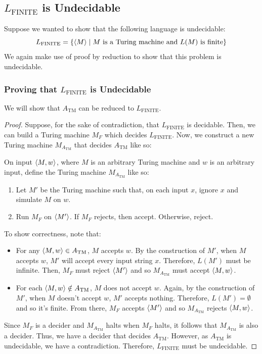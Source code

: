 \documentclass[letterpaper]{article}
\begin{document}
\subsection{\texorpdfstring{$L_{\text{FINITE}}$}{} is Undecidable}
Suppose we wanted to show that the following language is undecidable: 
\[L_{\text{FINITE}} = \{\langle M \rangle \mid M \text{ is a Turing machine and } L(M) \text{ is finite}\}\]
We again make use of proof by reduction to show that this problem is undecidable.

\subsubsection{Proving that \texorpdfstring{$L_{\text{FINITE}}$}{} is Undecidable}
We will show that $A_{\text{TM}}$ can be reduced to $L_{\text{FINITE}}$. 

\begin{mdframed}[]
    \begin{proof}
        Suppose, for the sake of contradiction, that $L_{\text{FINITE}}$ is decidable. Then, we can build a Turing machine $M_{F}$ which decides $L_{\text{FINITE}}$. Now, we construct a new Turing machine $M_{A_{\text{TM}}}$ that decides $A_{\text{TM}}$ like so: 
        \begin{mdframed}[]
            On input $\langle M, w \rangle$, where $M$ is an arbitrary Turing machine and $w$ is an arbitrary input, define the Turing machine $M_{A_{\text{TM}}}$ like so: 
            \begin{enumerate}
                \item Let $M'$ be the Turing machine such that, on each input $x$, ignore $x$ and simulate $M$ on $w$. 
                \item Run $M_F$ on $\langle M' \rangle$. If $M_F$ rejects, then accept. Otherwise, reject. 
            \end{enumerate}
        \end{mdframed}

        To show correctness, note that: 
        \begin{itemize}
            \item For any $\langle M, w \rangle \in A_{\text{TM}}$, $M$ accepts $w$. By the construction of $M'$, when $M$ accepts $w$, $M'$ will accept every input string $x$. Therefore, $L(M')$ must be infinite. Then, $M_F$ must reject $\langle M' \rangle$ and so $M_{A_{\text{TM}}}$ must accept $\langle M, w \rangle$. 
            \item For each $\langle M, w \rangle \notin A_{\text{TM}}$, $M$ does not accept $w$. Again, by the construction of $M'$, when $M$ doesn't accept $w$, $M'$ accepts nothing. Therefore, $L(M') = \emptyset$ and so it's finite. From there, $M_F$ accepts $\langle M' \rangle$ and so $M_{A_{\text{TM}}}$ rejects $\langle M, w \rangle$.
        \end{itemize}
        Since $M_F$ is a decider and $M_{A_{\text{TM}}}$ halts when $M_F$ halts, it follows that $M_{A_{\text{TM}}}$ is also a decider. Thus, we have a decider that decides $A_{\text{TM}}$. However, as $A_{\text{TM}}$ is undecidable, we have a contradiction. Therefore, $L_{\text{FINITE}}$ must be undecidable. 
    \end{proof}
\end{mdframed}
\end{document}
